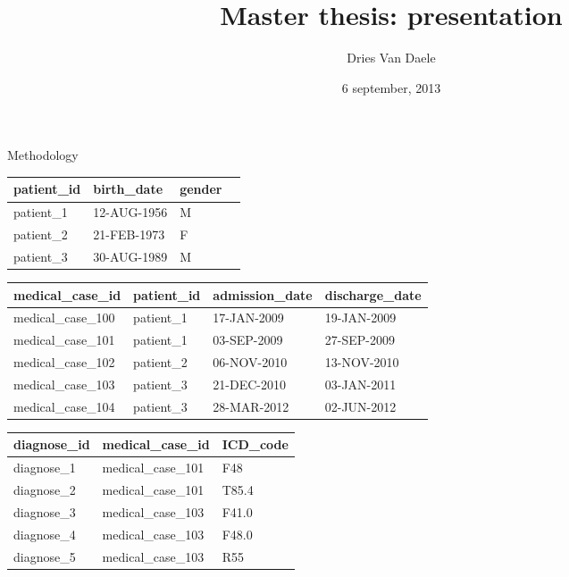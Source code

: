 \documentclass{beamer}
\title[Master thesis: presentation]
{Master thesis: presentation}
\author[Dries Van Daele]{Dries Van Daele}
\institute{DTAI masterproef KU Leuven}
\date{6 september, 2013}
\begin{document}
\begin{frame}{}
  \titlepage
\end{frame}

\begin{frame}{Methodology}
  \centering
  \begin{tabular}{| l | l | l | l |}
    \hline
    patient\_id & birth\_date  & gender \\ \hline
    patient\_1  & 12-AUG-1956 & M \\
    patient\_2  & 21-FEB-1973 & F \\
    patient\_3  & 30-AUG-1989 & M \\
    \hline
  \end{tabular}

  \begin{tabular}{| l | l | l | l|}
    \hline
    medical\_case\_id  & patient\_id & admission\_date & discharge\_date \\ \hline
    medical\_case\_100 & patient\_1  & 17-JAN-2009    & 19-JAN-2009    \\
    medical\_case\_101 & patient\_1  & 03-SEP-2009    & 27-SEP-2009    \\
    medical\_case\_102 & patient\_2  & 06-NOV-2010    & 13-NOV-2010    \\
    medical\_case\_103 & patient\_3  & 21-DEC-2010    & 03-JAN-2011    \\
    medical\_case\_104 & patient\_3  & 28-MAR-2012    & 02-JUN-2012    \\
    \hline
  \end{tabular}
  
  \begin{tabular}{| l | l | l |}
    \hline
    diagnose\_id & medical\_case\_id  & ICD\_code \\ \hline
    diagnose\_1  & medical\_case\_101 & F48      \\
    diagnose\_2  & medical\_case\_101 & T85.4    \\
    diagnose\_3  & medical\_case\_103 & F41.0    \\
    diagnose\_4  & medical\_case\_103 & F48.0    \\
    diagnose\_5  & medical\_case\_103 & R55      \\
    \hline
  \end{tabular}
\end{frame}
% 




\end{document}

